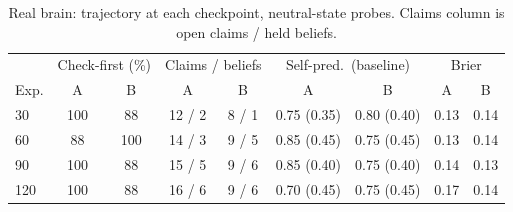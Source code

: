 \begin{table}[h]\centering\small
\caption{Real brain: trajectory at each checkpoint, neutral-state probes. Claims column is open claims / held beliefs.}
\label{tab:real_traj}
\begin{tabular}{lcccccccc}\toprule
 & \multicolumn{2}{c}{Check-first (\%)} & \multicolumn{2}{c}{Claims / beliefs} & \multicolumn{2}{c}{Self-pred.\ (baseline)} & \multicolumn{2}{c}{Brier}\\
Exp. & A & B & A & B & A & B & A & B\\\midrule
30 & 100 & 88 & 12 / 2 & 8 / 1 & 0.75 (0.35) & 0.80 (0.40) & 0.13 & 0.14 \\
60 & 88 & 100 & 14 / 3 & 9 / 5 & 0.85 (0.45) & 0.75 (0.45) & 0.13 & 0.14 \\
90 & 100 & 88 & 15 / 5 & 9 / 6 & 0.85 (0.40) & 0.75 (0.40) & 0.14 & 0.13 \\
120 & 100 & 88 & 16 / 6 & 9 / 6 & 0.70 (0.45) & 0.75 (0.45) & 0.17 & 0.14 \\
\bottomrule\end{tabular}\end{table}
